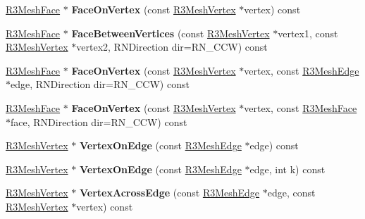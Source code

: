 \begin{DoxyCompactItemize}
\item 
\hyperlink{class_r3_mesh_face}{R3\+Mesh\+Face} $\ast$ {\bfseries Face\+On\+Vertex} (const \hyperlink{class_r3_mesh_vertex}{R3\+Mesh\+Vertex} $\ast$vertex) const \hypertarget{class_r3_mesh_aa0de995e792c99d6d021c712a15a4ef9}{}\label{class_r3_mesh_aa0de995e792c99d6d021c712a15a4ef9}

\item 
\hyperlink{class_r3_mesh_face}{R3\+Mesh\+Face} $\ast$ {\bfseries Face\+Between\+Vertices} (const \hyperlink{class_r3_mesh_vertex}{R3\+Mesh\+Vertex} $\ast$vertex1, const \hyperlink{class_r3_mesh_vertex}{R3\+Mesh\+Vertex} $\ast$vertex2, R\+N\+Direction dir=R\+N\+\_\+\+C\+CW) const \hypertarget{class_r3_mesh_af593f4076a60c96a892ee94ead169448}{}\label{class_r3_mesh_af593f4076a60c96a892ee94ead169448}

\item 
\hyperlink{class_r3_mesh_face}{R3\+Mesh\+Face} $\ast$ {\bfseries Face\+On\+Vertex} (const \hyperlink{class_r3_mesh_vertex}{R3\+Mesh\+Vertex} $\ast$vertex, const \hyperlink{class_r3_mesh_edge}{R3\+Mesh\+Edge} $\ast$edge, R\+N\+Direction dir=R\+N\+\_\+\+C\+CW) const \hypertarget{class_r3_mesh_a81476243eaf8ee16cc1a99d091875de4}{}\label{class_r3_mesh_a81476243eaf8ee16cc1a99d091875de4}

\item 
\hyperlink{class_r3_mesh_face}{R3\+Mesh\+Face} $\ast$ {\bfseries Face\+On\+Vertex} (const \hyperlink{class_r3_mesh_vertex}{R3\+Mesh\+Vertex} $\ast$vertex, const \hyperlink{class_r3_mesh_face}{R3\+Mesh\+Face} $\ast$face, R\+N\+Direction dir=R\+N\+\_\+\+C\+CW) const \hypertarget{class_r3_mesh_ac2119df7d67424761c6a349e523cc180}{}\label{class_r3_mesh_ac2119df7d67424761c6a349e523cc180}

\item 
\hyperlink{class_r3_mesh_vertex}{R3\+Mesh\+Vertex} $\ast$ {\bfseries Vertex\+On\+Edge} (const \hyperlink{class_r3_mesh_edge}{R3\+Mesh\+Edge} $\ast$edge) const \hypertarget{class_r3_mesh_ab9d397658766c50cac5be1008cc51f66}{}\label{class_r3_mesh_ab9d397658766c50cac5be1008cc51f66}

\item 
\hyperlink{class_r3_mesh_vertex}{R3\+Mesh\+Vertex} $\ast$ {\bfseries Vertex\+On\+Edge} (const \hyperlink{class_r3_mesh_edge}{R3\+Mesh\+Edge} $\ast$edge, int k) const \hypertarget{class_r3_mesh_abed5d5f7b6b895e8c68327f10f5ce22a}{}\label{class_r3_mesh_abed5d5f7b6b895e8c68327f10f5ce22a}

\item 
\hyperlink{class_r3_mesh_vertex}{R3\+Mesh\+Vertex} $\ast$ {\bfseries Vertex\+Across\+Edge} (const \hyperlink{class_r3_mesh_edge}{R3\+Mesh\+Edge} $\ast$edge, const \hyperlink{class_r3_mesh_vertex}{R3\+Mesh\+Vertex} $\ast$vertex) const \hypertarget{class_r3_mesh_a5757077d811dec01a4915bc82f16b067}{}\label{class_r3_mesh_a5757077d811dec01a4915bc82f16b067}


\end{DoxyCompactItemize}
